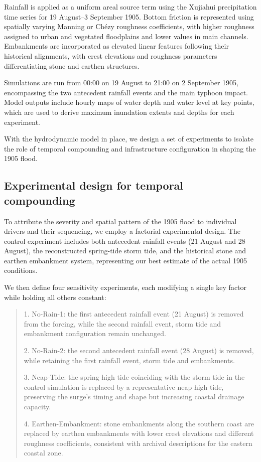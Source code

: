 \documentclass[
]{article}
\begin{document}
Rainfall is applied as a uniform areal source term using the Xujiahui
precipitation time series for 19 August--3 September 1905. Bottom
friction is represented using spatially varying Manning or Chézy
roughness coefficients, with higher roughness assigned to urban and
vegetated floodplains and lower values in main channels. Embankments are
incorporated as elevated linear features following their historical
alignments, with crest elevations and roughness parameters
differentiating stone and earthen structures.

Simulations are run from 00:00 on 19 August to 21:00 on 2 September
1905, encompassing the two antecedent rainfall events and the main
typhoon impact. Model outputs include hourly maps of water depth and
water level at key points, which are used to derive maximum inundation
extents and depths for each experiment.

With the hydrodynamic model in place, we design a set of experiments to
isolate the role of temporal compounding and infrastructure
configuration in shaping the 1905 flood.

\subsection{\texorpdfstring{\textbf{Experimental design for temporal
compounding}}{Experimental design for temporal compounding}}\label{experimental-design-for-temporal-compounding}

To attribute the severity and spatial pattern of the 1905 flood to
individual drivers and their sequencing, we employ a factorial
experimental design. The control experiment includes both antecedent
rainfall events (21 August and 28 August), the reconstructed spring-tide
storm tide, and the historical stone and earthen embankment system,
representing our best estimate of the actual 1905 conditions.

We then define four sensitivity experiments, each modifying a single key
factor while holding all others constant:

\begin{quote}
1. No-Rain-1: the first antecedent rainfall event (21 August) is removed
from the forcing, while the second rainfall event, storm tide and
embankment configuration remain unchanged.

2. No-Rain-2: the second antecedent rainfall event (28 August) is
removed, while retaining the first rainfall event, storm tide and
embankments.

3. Neap-Tide: the spring high tide coinciding with the storm tide in the
control simulation is replaced by a representative neap high tide,
preserving the surge's timing and shape but increasing coastal drainage
capacity.

4. Earthen-Embankment: stone embankments along the southern coast are
replaced by earthen embankments with lower crest elevations and
different roughness coefficients, consistent with archival descriptions
for the eastern coastal zone.
\end{quote}
\end{document}
